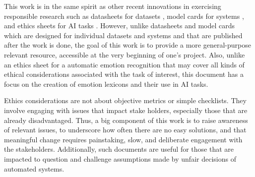 \documentclass[11pt]{article}
\newcommand{\sm}[1]{{\color{black} #1}} %
\begin{document}
\sm{This work is in the same spirit as other recent innovations in exercising responsible research such as
datasheets for datasets \cite{Gebru2018DatasheetsFD}, model cards for systems \cite{mitchell2019model},
and ethics sheets for AI tasks \cite{mohammad-2022-ethics}. However, unlike datasheets and model cards which are designed for individual 
datasets and systems and that are published after the work is done, the goal of this work is to provide a more general-purpose relevant resource,
accessible at the very beginning of one's project.
Also, unlike an ethics sheet for a automatic emotion recognition that may cover all kinds of ethical considerations associated with the task of interest, this document has a focus on  the creation of emotion lexicons and their use in AI tasks. 
}

\sm{Ethics considerations are not about objective metrics or simple checklists. They involve engaging with issues that impact stake holders, especially those that are already disadvantaged. Thus, a big component of this work is to raise awareness of relevant issues, to underscore how often there are no easy solutions, and that meaningful change requires painstaking, slow, and deliberate engagement with the stakeholders. 
Additionally, %
such documents are useful for those that are impacted to question and challenge assumptions made by unfair decisions of automated systems.}
\end{document}
